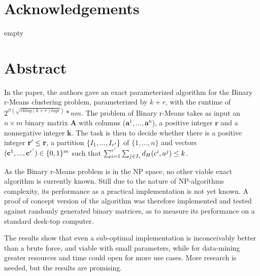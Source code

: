 \documentclass[a4paper]{article}
\begin{document}
%
%


%
%
\section*{Acknowledgements}
empty
\newpage

%
%
\section*{Abstract}
In the \cite{fomin_golovach_panolan_2020} paper, the authors gave an exact parameterized
algorithm for the Binary r-Means clustering problem, parameterized by $k+r$, with the runtime of
$2^{\mathcal{O} (\sqrt{rk log(k+r) logr})}*nm$. The problem of Binary r-Means takes as input
an $n \times m$ binary matrix \textbf{A} with columns ($\textbf{a}^1,...,\textbf{a}^n$), a positive
integer $\textbf{r}$ and a nonnegative integer $\textbf{k}$.
The task is then to decide whether there is a positive integer $\textbf{r}\sp{\prime} \leq \textbf{r}$,
a partition $\{I_1, ..., I_{r\sp{\prime}}\}$ of $\{1,...,n\}$ and vectors
$(\textbf{c}^1,...,\textbf{c}^{r\sp{\prime}}) \in \{0,1\}^m$ such that
$\sum_{i = 1}^{r\sp{\prime}} \sum_{j \in I_i} d_H(c^i, a^j) \leq k $.

As the Binary r-Means problem is in the NP space, no other viable exact algorithm is currently known. Still due to
the nature of NP-algorithms complexity, its performance as a practical implementation is not yet known.
A proof of concept version of the algorithm was therefore implemented and tested against randomly generated binary matrices,
as to measure its performance on a standard desk-top computer.

The results show that even a sub-optimal implementation is inconceivably better than a brute force, and
viable with small parameters, while for data-mining greater resources and time could open for more use cases. More
research is needed, but the results are promising.


\newpage

%
%
\tableofcontents
\newpage

%
%
\listofalgorithms
\newpage
\end{document}
